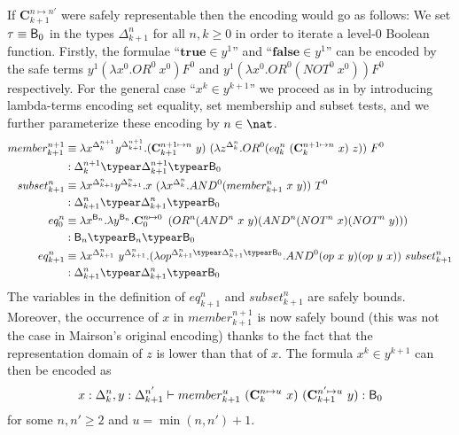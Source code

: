 If $\mathbf{C}^{n\mapsto n'}_{k+1}$ were safely representable then the encoding would go as follows: We set $\tau \equiv \mathsf{B}_0$ in the types  $\Delta_{k+1}^n$ for all $n,k\geq 0$ in order to iterate a level-$0$ Boolean function.
Firstly, the formulae ``$\mathbf{true} \in y^1$'' and ``$\mathbf{false} \in y^1$'' can be encoded by the safe terms $y^1 (\lambda x^0 . OR^0~x^0) F^0$ and $y^1 (\lambda x^0. OR^0(NOT^0~x^0)) F^0$ respectively.
For the general case ``$x^k\in y^{k+1}$''
we proceed as in \cite{mairson1992spt} by introducing lambda-terms encoding set equality, set membership and subset tests, and we further parameterize these encoding by $n\in\nat$.
\begin{align*}
member_{k+1}^{n+1} &\equiv \lambda x^{\Delta_k^{n+1}} y^{\Delta_{k+1}^{n+1}}.
(\mathbf{C}_{k+1}^{n+1\mapsto n}~y)~(\lambda z^{\Delta_k^n} . OR^0 (eq_k^n~(\mathbf{C}^{n+1\mapsto n}_k~x)~z))~F^0\\
  & : \Delta_k^{n+1} \typear \Delta_{k+1}^{n+1} \typear \booltype_0
\\
subset_{k+1}^n &\equiv \lambda x^{\Delta_{k+1}^n} y^{\Delta_{k+1}^n}.
x~(\lambda x^{\Delta_k^n} . AND^0 (member_{k+1}^n~x~y))~T^0 \\
  & : \Delta_{k+1}^n \typear \Delta_{k+1}^n \typear\booltype_0
\\
eq_0^n &\equiv \lambda x^{\booltype_n} .\lambda y^{\booltype_n}. \mathbf{C}_0^{n\mapsto 0}~ \left(OR^n (AND^n~x~y) (AND^n (NOT^n~x)(NOT^n~y))\right) \\
 &: \booltype_n \typear \booltype_n \typear\booltype_0
\\
eq_{k+1}^n &\equiv \lambda x^{\Delta_{k+1}^n}~ y^{\Delta_{k+1}^n}.
   (\lambda op^{\Delta_{k+1}^n\typear\Delta_{k+1}^n\typear\booltype_0}. AND^0 (op~x~y)(op~y~x))~subset_{k+1}^n \\
  & : \Delta_{k+1}^n \typear \Delta_{k+1}^n \typear \booltype_0
\end{align*}
The variables in the definition of $eq_{k+1}^n$ and $subset_{k+1}^n$
are safely bounds. Moreover, the occurrence of $x$ in
$member_{k+1}^{n+1}$ is now safely bound (this was not the case in
Mairson's original encoding) thanks to the fact that the
representation domain of $z$ is lower than that of $x$. The formula
$x^k\in y^{k+1}$ can then be encoded as
$$x:\Delta_k^n, y:\Delta_{k+1}^{n'}\vdash member_{k+1}^{u}~ (\mathbf{C}_k^{n\mapsto u}~x)~(\mathbf{C}^{n'\mapsto u}_{k+1} ~y) : \mathsf{B}_0$$
for some $n,n'\geq 2$ and $u = \min(n,n')+1$.

